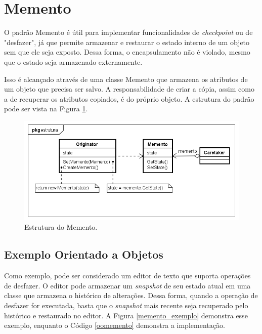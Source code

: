 \section{Memento}

O padrão Memento é útil para implementar funcionalidades 
de \textit{checkpoint} ou de "desfazer", já que permite 
armazenar e restaurar o estado interno de um objeto 
sem que ele seja exposto. Dessa forma, o encapsulamento 
não é violado, mesmo que o estado seja armazenado externamente.
\cite{gamma:1995}

Isso é alcançado através de uma classe Memento que armazena os 
atributos de um objeto que precisa ser salvo. A responsabilidade 
de criar a cópia, assim como a de recuperar os atributos copiados, 
é do próprio objeto. A estrutura do padrão pode ser vista 
na Figura \ref{memento_struct}.

\begin{figure}[htb]
	\caption{\label{memento_struct}Estrutura do Memento.}
	\begin{center}
	    \includegraphics[scale=0.5]{5_padroes-contexto-funcional/5.3_comportamentais/5.3.06_memento/memento_estrutura.png}
	\end{center}
\end{figure}

\subsection*{Exemplo Orientado a Objetos}

Como exemplo, pode ser considerado um editor de texto que 
suporta operações de desfazer. O editor pode armazenar um 
\textit{snapshot} de seu estado atual em uma classe que 
armazena o histórico de alterações. Dessa forma, quando a 
operação de desfazer for executada, basta que o 
\textit{snapshot} mais recente seja recuperado pelo histórico 
e restaurado no editor. A Figura \ref{memento_exemplo} demonstra 
esse exemplo, enquanto o Código \ref{oomemento} demonstra a 
implementação.

